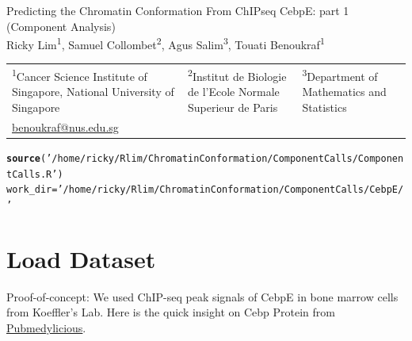 \documentclass{article}\usepackage[]{graphicx}\usepackage[]{color}
\makeatletter
\newcommand{\hlstr}[1]{\textcolor[rgb]{0.192,0.494,0.8}{#1}}%
\newcommand{\hlstd}[1]{\textcolor[rgb]{0.345,0.345,0.345}{#1}}%
\newcommand{\hlkwb}[1]{\textcolor[rgb]{0.69,0.353,0.396}{#1}}%
\newcommand{\hlkwd}[1]{\textcolor[rgb]{0.737,0.353,0.396}{\textbf{#1}}}%
\newenvironment{kframe}{%
 \def\at@end@of@kframe{}%
 \ifinner\ifhmode%
  \def\at@end@of@kframe{\end{minipage}}%
  \begin{minipage}{\columnwidth}%
 \fi\fi%
 \def\FrameCommand##1{\hskip\@totalleftmargin \hskip-\fboxsep
 \colorbox{shadecolor}{##1}\hskip-\fboxsep
     \hskip-\linewidth \hskip-\@totalleftmargin \hskip\columnwidth}%
 \MakeFramed {\advance\hsize-\width
   \@totalleftmargin\z@ \linewidth\hsize
   \@setminipage}}%
 {\par\unskip\endMakeFramed%
 \at@end@of@kframe}
\newenvironment{knitrout}{}{} %
\newcommand\Mark[1]{\textsuperscript#1}
\makeatother
\begin{document}
\begingroup
\centering
{\LARGE Predicting the Chromatin Conformation From ChIPseq CebpE: part 1 (Component Analysis) \\[1.5em]
\large Ricky Lim\Mark{1}, Samuel Collombet\Mark{2}, Agus Salim\Mark{3}, Touati Benoukraf\Mark{1}}\\[1em]
\begin{tabular}{*{3}{>{\centering}p{}}}
    \Mark{1}Cancer Science Institute of Singapore, National University of Singapore&\Mark{2}Institut de Biologie de l'Ecole Normale Superieur de Paris& \Mark{3}Department of Mathematics and Statistics& \tabularnewline
\url{benoukraf@nus.edu.sg}
\end{tabular}\par
\endgroup

\begin{knitrout}
\color{fgcolor}\begin{kframe}
\begin{alltt}
\hlkwd{source}\hlstd{(}\hlstr{'/home/ricky/Rlim/ChromatinConformation/ComponentCalls/ComponentCalls.R'}\hlstd{)}
\hlstd{work_dir} \hlkwb{=} \hlstr{'/home/ricky/Rlim/ChromatinConformation/ComponentCalls/CebpE/'}
\end{alltt}
\end{kframe}
\end{knitrout}

\section{Load Dataset}
Proof-of-concept: We used ChIP-seq peak signals of CebpE in bone marrow cells from Koeffler's Lab.
Here is the quick insight on Cebp Protein from \href{https://pubmedylicious.appspot.com/result/564730861610598://pubmedylicious.appspot.com/result/5073520312713216}{Pubmedylicious}.
\end{document}
